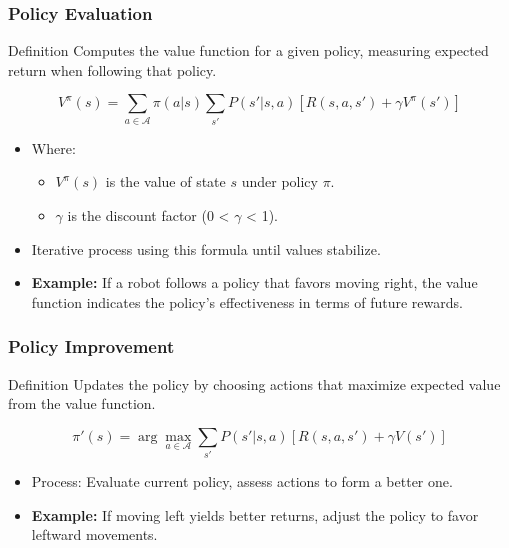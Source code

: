 \documentclass[aspectratio=169]{beamer}
\begin{document}
\begin{frame}[fragile]
  \frametitle{Policy Evaluation}
  \begin{block}{Definition}
    Computes the value function for a given policy, measuring expected return when following that policy.
  \end{block}
  
  \begin{equation}
  V^\pi(s) = \sum_{a \in \mathcal{A}} \pi(a|s) \sum_{s'} P(s'|s,a) [R(s,a,s') + \gamma V^\pi(s')]
  \end{equation}
  
  \begin{itemize}
    \item Where:
    \begin{itemize}
      \item $V^\pi(s)$ is the value of state $s$ under policy $\pi$.
      \item $\gamma$ is the discount factor (0 < $\gamma$ < 1).
    \end{itemize}
    \item Iterative process using this formula until values stabilize.
    \item \textbf{Example:} If a robot follows a policy that favors moving right, the value function indicates the policy's effectiveness in terms of future rewards.
  \end{itemize}
\end{frame}

\begin{frame}[fragile]
  \frametitle{Policy Improvement}
  \begin{block}{Definition}
    Updates the policy by choosing actions that maximize expected value from the value function.
  \end{block}

  \begin{equation}
  \pi'(s) = \arg\max_{a \in \mathcal{A}} \sum_{s'} P(s'|s,a) [R(s,a,s') + \gamma V(s')]
  \end{equation}

  \begin{itemize}
    \item Process: Evaluate current policy, assess actions to form a better one.
    \item \textbf{Example:} If moving left yields better returns, adjust the policy to favor leftward movements.
  \end{itemize}
\end{frame}
\end{document}

